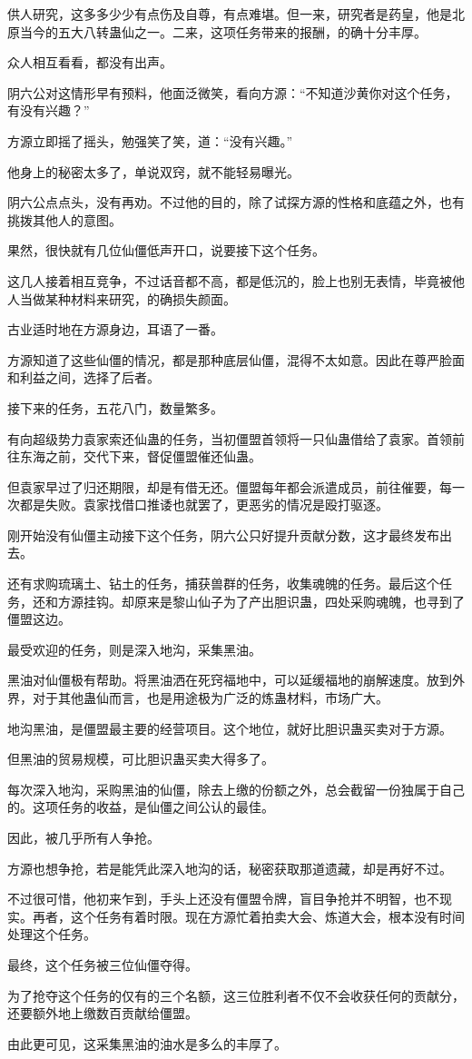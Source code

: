 \begin{this_body}
供人研究，这多多少少有点伤及自尊，有点难堪。但一来，研究者是药皇，他是北原当今的五大八转蛊仙之一。二来，这项任务带来的报酬，的确十分丰厚。

众人相互看看，都没有出声。

阴六公对这情形早有预料，他面泛微笑，看向方源：“不知道沙黄你对这个任务，有没有兴趣？”

方源立即摇了摇头，勉强笑了笑，道：“没有兴趣。”

他身上的秘密太多了，单说双窍，就不能轻易曝光。

阴六公点点头，没有再劝。不过他的目的，除了试探方源的性格和底蕴之外，也有挑拨其他人的意图。

果然，很快就有几位仙僵低声开口，说要接下这个任务。

这几人接着相互竞争，不过话音都不高，都是低沉的，脸上也别无表情，毕竟被他人当做某种材料来研究，的确损失颜面。

古业适时地在方源身边，耳语了一番。

方源知道了这些仙僵的情况，都是那种底层仙僵，混得不太如意。因此在尊严脸面和利益之间，选择了后者。

接下来的任务，五花八门，数量繁多。

有向超级势力袁家索还仙蛊的任务，当初僵盟首领将一只仙蛊借给了袁家。首领前往东海之前，交代下来，督促僵盟催还仙蛊。

但袁家早过了归还期限，却是有借无还。僵盟每年都会派遣成员，前往催要，每一次都是失败。袁家找借口推诿也就罢了，更恶劣的情况是殴打驱逐。

刚开始没有仙僵主动接下这个任务，阴六公只好提升贡献分数，这才最终发布出去。

还有求购琉璃土、钻土的任务，捕获兽群的任务，收集魂魄的任务。最后这个任务，还和方源挂钩。却原来是黎山仙子为了产出胆识蛊，四处采购魂魄，也寻到了僵盟这边。

最受欢迎的任务，则是深入地沟，采集黑油。

黑油对仙僵极有帮助。将黑油洒在死窍福地中，可以延缓福地的崩解速度。放到外界，对于其他蛊仙而言，也是用途极为广泛的炼蛊材料，市场广大。

地沟黑油，是僵盟最主要的经营项目。这个地位，就好比胆识蛊买卖对于方源。

但黑油的贸易规模，可比胆识蛊买卖大得多了。

每次深入地沟，采购黑油的仙僵，除去上缴的份额之外，总会截留一份独属于自己的。这项任务的收益，是仙僵之间公认的最佳。

因此，被几乎所有人争抢。

方源也想争抢，若是能凭此深入地沟的话，秘密获取那道遗藏，却是再好不过。

不过很可惜，他初来乍到，手头上还没有僵盟令牌，盲目争抢并不明智，也不现实。再者，这个任务有着时限。现在方源忙着拍卖大会、炼道大会，根本没有时间处理这个任务。

最终，这个任务被三位仙僵夺得。

为了抢夺这个任务的仅有的三个名额，这三位胜利者不仅不会收获任何的贡献分，还要额外地上缴数百贡献给僵盟。

由此更可见，这采集黑油的油水是多么的丰厚了。

\end{this_body}

